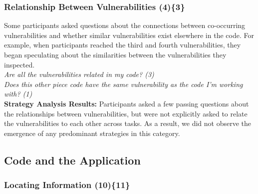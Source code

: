 \documentclass[10pt,journal,compsoc]{IEEEtran}
\begin{document}


\subsubsection{Relationship Between Vulnerabilities (4)\{3\}}\label{rbb}

Some participants asked questions about the connections between co-occurring vulnerabilities and whether similar vulnerabilities exist elsewhere in the code. 
For example, when participants reached the third and fourth vulnerabilities, they began speculating about the similarities between the vulnerabilities they inspected.
\\

\noindent\emph{Are all the vulnerabilities related in my code? (3)} \\
\emph{Does this other piece code have the same vulnerability as the code I'm working with? (1)} 
\\

\textbf{Strategy Analysis Results:}
Participants asked a few passing questions about the relationships between vulnerabilities, but were not explicitly asked to relate the vulnerabilities to each other across tasks. 
As a result, we did not observe the emergence of any predominant strategies in this category.

%


\subsection{Code and the Application}
\label{sec:results-ca}
\subsubsection{Locating Information (10)\{11\}}\label{li}
\end{document}
